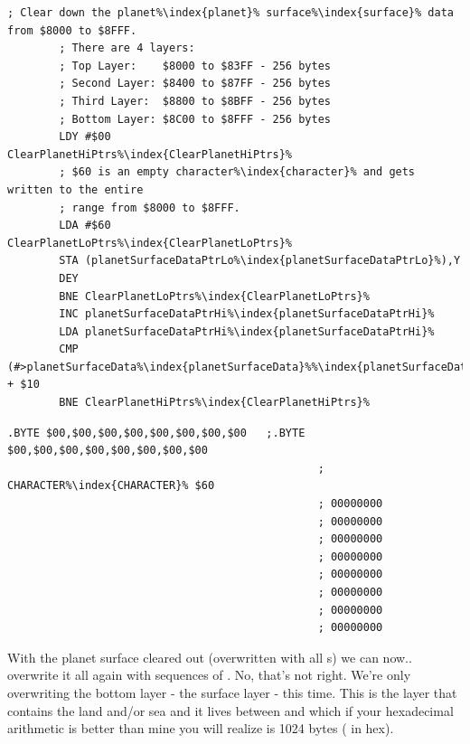\begin{lstlisting}[escapechar=\%,caption=The surface\index{surface} data is stored from \icode{\$8000} to \icode{\$8FFF}. This code overwrites it all with 
the value \$60\, which is an empty bitmap.]
        ; Clear down the planet%\index{planet}% surface%\index{surface}% data from $8000 to $8FFF.
        ; There are 4 layers:
        ; Top Layer:    $8000 to $83FF - 256 bytes 
        ; Second Layer: $8400 to $87FF - 256 bytes 
        ; Third Layer:  $8800 to $8BFF - 256 bytes 
        ; Bottom Layer: $8C00 to $8FFF - 256 bytes 
        LDY #$00
ClearPlanetHiPtrs%\index{ClearPlanetHiPtrs}%   
        ; $60 is an empty character%\index{character}% and gets written to the entire
        ; range from $8000 to $8FFF.
        LDA #$60
ClearPlanetLoPtrs%\index{ClearPlanetLoPtrs}%   
        STA (planetSurfaceDataPtrLo%\index{planetSurfaceDataPtrLo}%),Y
        DEY
        BNE ClearPlanetLoPtrs%\index{ClearPlanetLoPtrs}%
        INC planetSurfaceDataPtrHi%\index{planetSurfaceDataPtrHi}%
        LDA planetSurfaceDataPtrHi%\index{planetSurfaceDataPtrHi}%
        CMP (#>planetSurfaceData%\index{planetSurfaceData}%%\index{planetSurfaceData%\index{planetSurfaceData}%}%) + $10
        BNE ClearPlanetHiPtrs%\index{ClearPlanetHiPtrs}%
\end{lstlisting}

\begin{lstlisting}[caption=The empty character\index{character} bit map (all zeroes) used to overwrite the surface\index{surface} before populating it.,basicstyle=\tiny,escapechar=\%]
        .BYTE $00,$00,$00,$00,$00,$00,$00,$00   ;.BYTE $00,$00,$00,$00,$00,$00,$00,$00
                                                ; CHARACTER%\index{CHARACTER}% $60
                                                ; 00000000           
                                                ; 00000000           
                                                ; 00000000           
                                                ; 00000000           
                                                ; 00000000           
                                                ; 00000000           
                                                ; 00000000           
                                                ; 00000000           
\end{lstlisting}

With the planet surface cleared out (overwritten with all s) we can now.. overwrite it all again with sequences of
. No, that's not right. We're only overwriting the bottom layer - the surface layer - this time. This is the
layer that contains the land and/or sea and it lives between  and  which if your hexadecimal
arithmetic is better than mine you will realize is 1024 bytes ( in hex).

